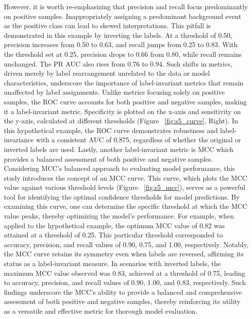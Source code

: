 However, it is worth re-emphasizing that precision and recall focus predominantly on positive samples. Inappropriately assigning a predominant background event as the positive class can lead to skewed interpretations. This pitfall is demonstrated in this example by inverting the labels. At a threshold of 0.50, precision increases from 0.50 to 0.63, and recall jumps from 0.25 to 0.83. With the threshold set at 0.25, precision drops to 0.66 from 0.80, while recall remains unchanged. The PR AUC also rises from 0.76 to 0.94. Such shifts in metrics, driven merely by label rearrangement unrelated to the data or model characteristics, underscore the importance of label-invariant metrics that remain unaffected by label assignments.
Unlike metrics focusing solely on positive samples, the ROC curve accounts for both positive and negative samples, making it a label-invariant metric. Specificity is plotted on the x-axis and sensitivity on the y-axis, calculated at different thresholds (Figure ~\ref{fig:s5_curve}, Right). In this hypothetical example, the ROC curve demonstrates robustness and label-invariance with a consistent AUC of 0.875, regardless of whether the original or inverted labels are used.
Lastly, another label-invariant metric is MCC which provides a balanced assessment of both positive and negative samples. Considering MCC's balanced approach to evaluating model performance, this study introduces the concept of an MCC curve. This curve, which plots the MCC value against various threshold levels (Figure ~\ref{fig:s5_mcc}), serves as a powerful tool for identifying the optimal confidence thresholds for model predictions. By examining this curve, one can determine the specific threshold at which the MCC value peaks, thereby optimizing the model's performance. For example, when applied to the hypothetical example, the optimum MCC value of 0.82 was attained at a threshold of 0.25. This particular threshold corresponded to accuracy, precision, and recall values of 0.90, 0.75, and 1.00, respectively. Notably, the MCC curve retains its symmetry even when labels are reversed, affirming its status as a label-invariant measure. In scenarios with inverted labels, the maximum MCC value observed was 0.83, achieved at a threshold of 0.75, leading to accuracy, precision, and recall values of 0.90, 1.00, and 0.83, respectively. Such findings underscore the MCC's ability to provide a balanced and comprehensive assessment of both positive and negative samples, thereby reinforcing its utility as a versatile and effective metric for thorough model evaluation.

